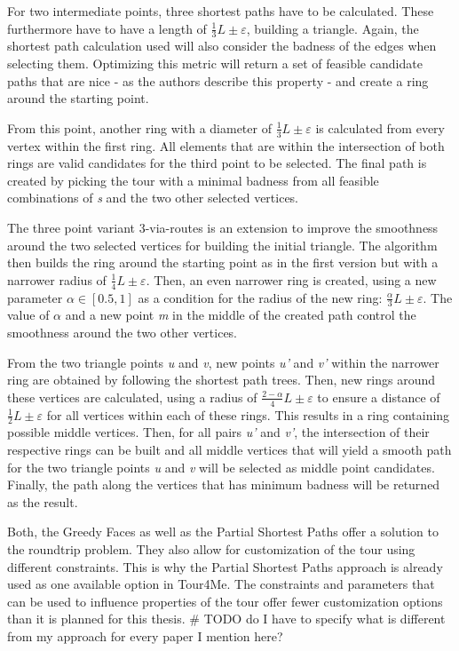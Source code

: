 For two intermediate points, three shortest paths have to be calculated.
These furthermore have to have a length of $\frac{1}{3} L \pm \varepsilon$, building a triangle.
Again, the shortest path calculation used will also consider the badness of the edges when selecting them.
Optimizing this metric will return a set of feasible candidate paths that are \glqq nice\grqq{} - as the authors describe this property - and create a ring around the starting point.

From this point, another ring with a diameter of $\frac{1}{3} L \pm \varepsilon$ is calculated from every vertex within the first ring.
All elements that are within the intersection of both rings are valid candidates for the third point to be selected. 
The final path is created by picking the tour with a minimal badness from all feasible combinations of \textit{s} and the two other selected vertices. \cite{gemsa_efficient_2013}

The three point variant 3-via-routes is an extension to improve the smoothness around the two selected vertices for building the initial triangle. 
The algorithm then builds the ring around the starting point as in the first version but with a narrower radius of $\frac{1}{4} L \pm \varepsilon$.
Then, an even narrower ring is created, using a new parameter $\alpha \in [0.5,1]$ as a condition for the radius of the new ring: $\frac{\alpha}{3} L \pm \varepsilon$.
The value of $\alpha$ and a new point \textit{m} in the middle of the created path control the smoothness around the two other vertices.

From the two triangle points \textit{u} and \textit{v}, new points \textit{u'} and \textit{v'} within the narrower ring are obtained by following the shortest path trees. 
Then, new rings around these vertices are calculated, using a radius of  $\frac{2-\alpha}{4} L \pm \varepsilon$ to ensure a distance of  $\frac{1}{2} L \pm \varepsilon$ for all vertices within each of these rings.
This results in a ring containing possible middle vertices.
Then, for all pairs \textit{u'} and \textit{v'}, the intersection of their respective rings can be built and all middle vertices that will yield a smooth path for the two triangle points \textit{u} and \textit{v} will be selected as middle point candidates.
Finally, the path along the vertices that has minimum badness will be returned as the result. \cite{gemsa_efficient_2013, pajor_algorithm_2013}

Both, the Greedy Faces as well as the Partial Shortest Paths offer a solution to the roundtrip problem.
They also allow for customization of the tour using different constraints. 
This is why the Partial Shortest Paths approach is already used as one available option in Tour4Me. 
The constraints and parameters that can be used to influence properties of the tour offer fewer customization options than it is planned for this thesis. \# TODO do I have to specify what is different from my approach for every paper I mention here?


